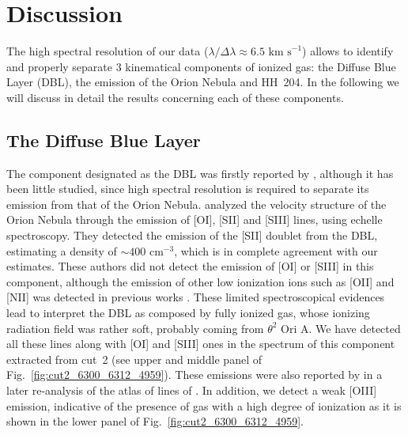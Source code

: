 \documentclass[twocolumn]{aastex63}
\begin{document}
\section{Discussion}
\label{sec:dic}


The high spectral resolution of our data ($\lambda/\Delta \lambda \approx 6.5 \text{ km s}^{-1}$) allows to identify and properly separate 3 kinematical components of ionized gas: the Diffuse Blue Layer (DBL), the emission of the Orion Nebula and HH~204. In the following we will discuss in detail the results concerning each of these components. 

\subsection{The Diffuse Blue Layer}
\label{subsec:disc_blue_layer}

The component designated as the DBL was firstly reported by \citet{Deharveng73}, although it has been little studied, since high spectral resolution is required to separate its emission from that of the Orion Nebula. \citet{garciadiaz07} analyzed the velocity structure of the Orion Nebula through the emission of [O\thinspace I], [S\thinspace II] and [S\thinspace III] lines, using echelle spectroscopy. They detected the emission of the [S\thinspace II] doublet from the DBL, estimating a density of $\sim 400 \text{ cm}^{-3}$, which is in complete agreement with our estimates. These authors did not detect the emission of [O\thinspace I] or [S\thinspace III] in this component, although the emission of other low ionization ions such as [O\thinspace II] and [N\thinspace II] was detected in previous works \citep{Jones92,henneyodell99}. These limited  spectroscopical evidences lead to interpret the DBL as composed by fully ionized gas, whose ionizing radiation field was rather soft, probably coming from $\theta^{2} \text{ Ori A}$. We have detected all these lines along with [O\thinspace I] and [S\thinspace III] ones in the spectrum of this component extracted from cut~2 (see upper and middle panel of Fig.~\ref{fig:cut2_6300_6312_4959}). These emissions were also reported by \citet{odell18} in a later re-analysis of the atlas of lines of \citet[][]{garciadiaz07}. In addition, we detect a weak [O\thinspace III] emission, indicative of the presence of gas with a high degree of ionization as it is shown in the lower panel of Fig.~\ref{fig:cut2_6300_6312_4959}. 
\end{document}
